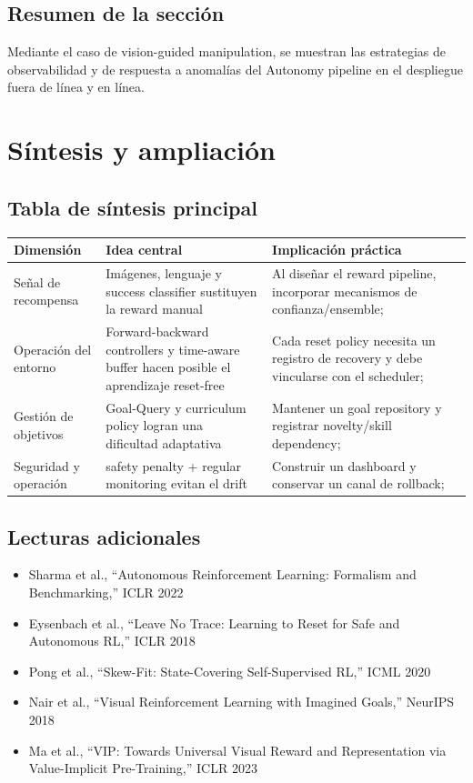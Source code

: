 \documentclass[a4paper]{article}
\begin{document}
\subsection{Resumen de la sección}
Mediante el caso de vision-guided manipulation, se muestran las estrategias de observabilidad y de respuesta a anomalías del Autonomy pipeline en el despliegue fuera de línea y en línea.
\newpage
\section{Síntesis y ampliación}
\subsection{Tabla de síntesis principal}
\begin{tabularx}{\textwidth}{lXl}
\toprule
Dimensión & Idea central & Implicación práctica \\
\midrule
Señal de recompensa & Imágenes, lenguaje y success classifier sustituyen la reward manual & Al diseñar el reward pipeline, incorporar mecanismos de confianza/ensemble; \\
Operación del entorno & Forward-backward controllers y time-aware buffer hacen posible el aprendizaje reset-free & Cada reset policy necesita un registro de recovery y debe vincularse con el scheduler; \\
Gestión de objetivos & Goal-Query y curriculum policy logran una dificultad adaptativa & Mantener un goal repository y registrar novelty/skill dependency; \\
Seguridad y operación & safety penalty + regular monitoring evitan el drift & Construir un dashboard y conservar un canal de rollback; \\
\bottomrule
\end{tabularx}

\subsection{Lecturas adicionales}
\begin{itemize}
\item Sharma et al., ``Autonomous Reinforcement Learning: Formalism and Benchmarking,'' ICLR 2022
\item Eysenbach et al., ``Leave No Trace: Learning to Reset for Safe and Autonomous RL,'' ICLR 2018
\item Pong et al., ``Skew-Fit: State-Covering Self-Supervised RL,'' ICML 2020
\item Nair et al., ``Visual Reinforcement Learning with Imagined Goals,'' NeurIPS 2018
\item Ma et al., ``VIP: Towards Universal Visual Reward and Representation via Value-Implicit Pre-Training,'' ICLR 2023
\end{itemize}
\end{document}
